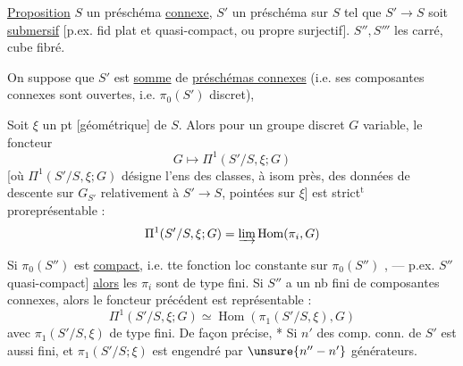 \uline{Proposition} $S$ un préschéma \uline{connexe},
$S'$ un préschéma sur $S$ tel que $S'\to S$ soit \uline{submersif}
[p.ex. fid plat et quasi-compact, ou propre surjectif].
$S'',S'''$ les carré, cube fibré.

On suppose que $S'$ est \uline{somme} de \uline{préschémas connexes}
(i.e. ses composantes connexes sont ouvertes, i.e. $\pi_0(S')$ discret),

Soit $\xi$ un pt [géométrique] de $S$. Alors pour un groupe discret $G$ variable, le foncteur
\[
G\longmapsto\Pi^1(S'/S,\xi;G)
\]
 [où $\Pi^1(S'/S,\xi;G)$ désigne l'ens des classes, à isom près, des données de descente sur $G_{S'}$  relativement à $S'\to S$, pointées sur $\xi$] est strict$^{\mathrm t}$ proreprésentable :
\[
\Pi^1(S'/S,\xi;G)=\varinjlim\operatorname{Hom}(\pi_i,G)
\]

Si $\pi_0(S'')$ est \uline{compact}, i.e. tte fonction loc constante sur $\pi_0(S'')$ , --- p.ex. $S''$ quasi-compact]
 
\uline{alors} les $\pi_i$ sont de type fini. Si $S''$ a un nb fini  de composantes connexes, alors le foncteur précédent est représentable :  
\[
\Pi^1(S'/S,\xi;G)\simeq\operatorname{Hom}(\pi_1(S'/S,\xi),G)
\]
avec $\pi_1(S'/S,\xi)$   de type fini.
De façon précise, * Si  $n'$ des comp. conn. de $S'$ est aussi fini, et  $\pi_1(S'/S;\xi)$ est engendré par $\unsure{n''-n'}$ générateurs.

